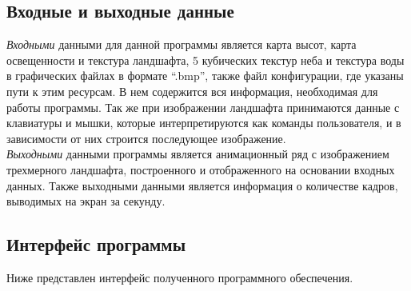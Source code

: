 \documentclass[a4paper, 10pt]{article}
\begin{document}
	\subsection{Входные и выходные данные}
	\hspace*{5mm} \textit{Входными} данными для данной программы является карта высот, карта освещенности и текстура ландшафта, 5 кубических текстур неба и текстура воды в графических файлах в формате “.bmp”, также файл конфигурации, где указаны пути к этим ресурсам. В нем содержится вся информация, необходимая для работы программы. Так же при изображении ландшафта принимаются данные с клавиатуры и мышки, которые интерпретируются как команды пользователя, и в зависимости от них строится последующее изображение.
	\\ \hspace*{5mm}\textit{Выходными} данными программы является анимационный ряд с изображением трехмерного ландшафта, построенного и отображенного на основании входных данных. Также выходными данными является информация о количестве кадров, выводимых на экран за секунду.
	
	\subsection{Интерфейс программы}
	\hspace*{5mm} Ниже представлен интерфейс полученного программного обеспечения. 
\end{document}
